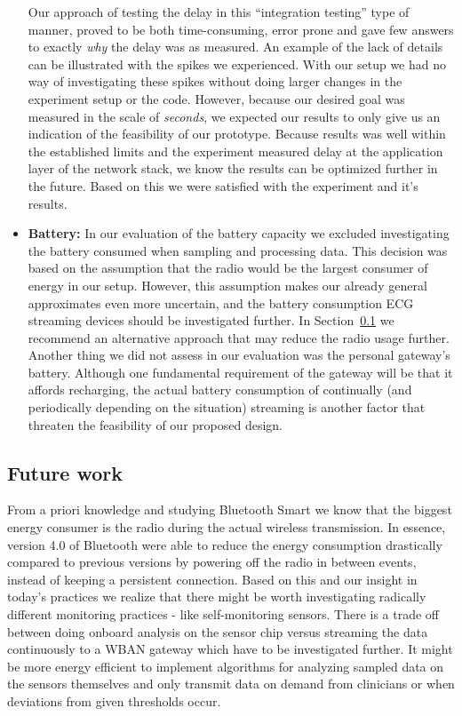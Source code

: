 \begin{itemize}
  Our approach of testing the delay in this ``integration testing'' type of manner, proved to be both time-consuming, error prone and gave few answers to exactly \emph{why} the delay was as measured. An example of the lack of details can be illustrated with the spikes we experienced. With our setup we had no way of investigating these spikes without doing larger changes in the experiment setup or the code. However, because our desired goal was measured in the scale of \emph{seconds}, we expected our results to only give us an indication of the feasibility of our prototype. Because results was well within the established limits and the experiment measured delay at the application layer of the network stack, we know the results can be optimized further in the future. Based on this we were satisfied with the experiment and it's results.
  \item \textbf{Battery:} In our evaluation of the battery capacity we excluded investigating the battery consumed when sampling and processing data. This decision was based on the assumption that the radio would be the largest consumer of energy in our setup. However, this assumption makes our already general approximates even more uncertain, and the battery consumption ECG streaming devices should be investigated further. In Section~\ref{sub:future_work} we recommend an alternative approach that may reduce the radio usage further. Another thing we did not assess in our evaluation was the personal gateway's battery. Although one fundamental requirement of the gateway will be that it affords recharging, the actual battery consumption of continually (and periodically depending on the situation) streaming is another factor that threaten the feasibility of our proposed design.

\end{itemize}




\subsection{Future work} %
\label{sub:future_work}


From a priori knowledge and studying Bluetooth Smart we know that the biggest energy consumer is the radio during the actual wireless transmission. In essence, version 4.0 of Bluetooth were able to reduce the energy consumption drastically compared to previous versions by powering off the radio in between events, instead of keeping a persistent connection. Based on this and our insight in today's practices we realize that there might be worth investigating radically different monitoring practices - like self-monitoring sensors. There is a trade off between doing onboard analysis on the sensor chip versus streaming the data continuously to a WBAN gateway which have to be investigated further. It might be more energy efficient to implement algorithms for analyzing sampled data on the sensors themselves and only transmit data on demand from clinicians or when deviations from given thresholds occur.

